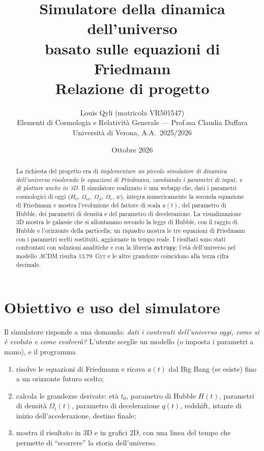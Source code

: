 \documentclass[11pt,a4paper]{article}
\title{\textbf{Simulatore della dinamica dell'universo\\basato sulle equazioni di Friedmann}\\[4pt]
\large Relazione di progetto}
\author{Louis Qyli \quad (matricola VR501547)\\[2pt]
\small Elementi di Cosmologia e Relatività Generale --- Prof.ssa Claudia Daffara\\
\small Università di Verona, A.A.\ 2025/2026}
\date{Ottobre 2026}
\newcommand{\Om}{\Omega_m}
\newcommand{\Or}{\Omega_r}
\newcommand{\OL}{\Omega_\Lambda}
\begin{document}
\maketitle

\begin{abstract}
\noindent
La richiesta del progetto era di \emph{implementare un piccolo simulatore di dinamica dell'universo risolvendo le equazioni di Friedmann, cambiando i parametri di input, e di plottare anche in 3D}.
Il simulatore realizzato è una webapp che, dati i parametri cosmologici di oggi ($H_0$, $\Om$, $\OL$, $\Or$, $w$), integra numericamente la seconda equazione di Friedmann e mostra l'evoluzione del fattore di scala $a(t)$, del parametro di Hubble, dei parametri di densità e del parametro di decelerazione.
La visualizzazione 3D mostra le galassie che si allontanano secondo la legge di Hubble, con il raggio di Hubble e l'orizzonte della particella; un riquadro mostra le tre equazioni di Friedmann con i parametri scelti sostituiti, aggiornate in tempo reale.
I risultati sono stati confrontati con soluzioni analitiche e con la libreria \texttt{astropy}: l'età dell'universo nel modello $\Lambda$CDM risulta \SI{13.79}{Gyr} e le altre grandezze coincidono alla terza cifra decimale.
\end{abstract}

\tableofcontents
\newpage

\section{Obiettivo e uso del simulatore}

Il simulatore risponde a una domanda: \emph{dati i contenuti dell'universo oggi, come si è evoluto e come evolverà?}
L'utente sceglie un modello (o imposta i parametri a mano), e il programma
\begin{enumerate}
  \item risolve le equazioni di Friedmann e ricava $a(t)$ dal Big Bang (se esiste) fino a un orizzonte futuro scelto;
  \item calcola le grandezze derivate: età $t_0$, parametro di Hubble $H(t)$, parametri di densità $\Omega_i(t)$, parametro di decelerazione $q(t)$, redshift, istante di inizio dell'accelerazione, destino finale;
  \item mostra il risultato in 3D e in grafici 2D, con una linea del tempo che permette di ``scorrere'' la storia dell'universo.
\end{enumerate}
\end{document}
